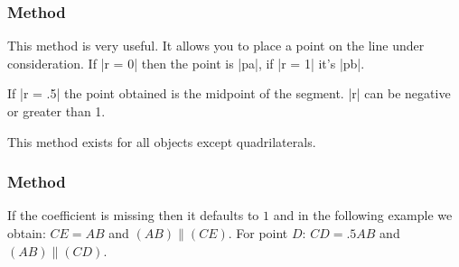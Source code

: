 \subsubsection{Method  }%
\label{ssub:method_point}
This method is very useful. It allows you to place a point on the line under consideration.
If |r = 0|  then the point is |pa|, if |r = 1| it's |pb|.

If |r = .5| the point obtained is the midpoint of the segment. |r| can be negative or greater than 1.

This method exists for all objects except quadrilaterals.

\begin{tkzexample}[latex=8cm]
  \begin{center}
  \end{center}
\end{tkzexample}

\subsubsection{Method } %
\label{ssub:method_imeth_line_colinear__at}
If the coefficient is missing then it defaults to $1$ and in the following example we obtain: $CE=AB$ and $(AB)\parallel (CE)$. For point $D$: $CD = .5AB$ and $(AB)\parallel (CD)$.

\vspace{6pt}
\begin{tkzexample}[latex=7cm]
  \begin{center}
  \end{center}
\end{tkzexample}


